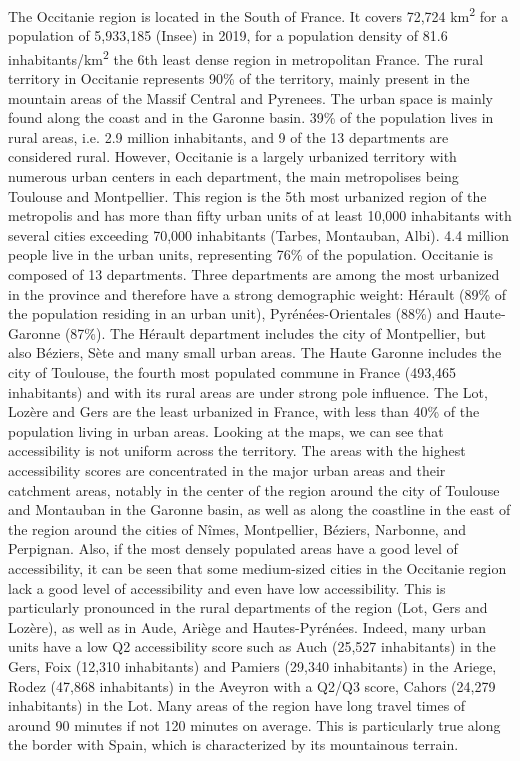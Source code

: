 The Occitanie region is located in the South of France. It covers 72,724 km\textsuperscript{2} for a population of 5,933,185 (Insee) in 2019, for a population density of 81.6 inhabitants/km\textsuperscript{2} the 6th least dense region in metropolitan France.
The rural territory in Occitanie represents 90\% of the territory, mainly present in the mountain areas of the Massif Central and Pyrenees. The urban space is mainly found along the coast and in the Garonne basin. 39\% of the population lives in rural areas, i.e. 2.9 million inhabitants, and 9 of the 13 departments are considered rural. However, Occitanie is a largely urbanized territory with numerous urban centers in each department, the main metropolises being Toulouse and Montpellier. This region is the 5th most urbanized region of the metropolis and has more than fifty urban units of at least 10,000 inhabitants with several cities exceeding 70,000 inhabitants (Tarbes, Montauban, Albi). 4.4 million people live in the urban units, representing 76\% of the population. Occitanie is composed of 13 departments. Three departments are among the most urbanized in the province and therefore have a strong demographic weight: Hérault (89\% of the population residing in an urban unit), Pyrénées-Orientales (88\%) and Haute-Garonne (87\%). The Hérault department includes the city of Montpellier, but also Béziers, Sète and many small urban areas. The Haute Garonne includes the city of Toulouse, the fourth most populated commune in France (493,465 inhabitants) and with its rural areas are under strong pole influence.  The Lot, Lozère and Gers are the least urbanized in France, with less than 40\% of the population living in urban areas. Looking at the maps, we can see that accessibility is not uniform across the territory. The areas with the highest accessibility scores are concentrated in the major urban areas and their catchment areas, notably in the center of the region around the city of Toulouse and Montauban in the Garonne basin, as well as along the coastline in the east of the region around the cities of Nîmes, Montpellier, Béziers, Narbonne, and Perpignan. Also, if the most densely populated areas have a good level of accessibility, it can be seen that some medium-sized cities in the Occitanie region lack a good level of accessibility and even have low accessibility. This is particularly pronounced in the rural departments of the region (Lot, Gers and Lozère), as well as in Aude, Ariège and Hautes-Pyrénées. Indeed, many urban units have a low Q2 accessibility score such as Auch (25,527 inhabitants) in the Gers, Foix (12,310 inhabitants) and Pamiers (29,340 inhabitants) in the Ariege, Rodez (47,868 inhabitants) in the Aveyron with a Q2/Q3 score, Cahors (24,279 inhabitants) in the Lot. Many areas of the region have long travel times of around 90 minutes if not 120 minutes on average. This is particularly true along the border with Spain, which is characterized by its mountainous terrain.

